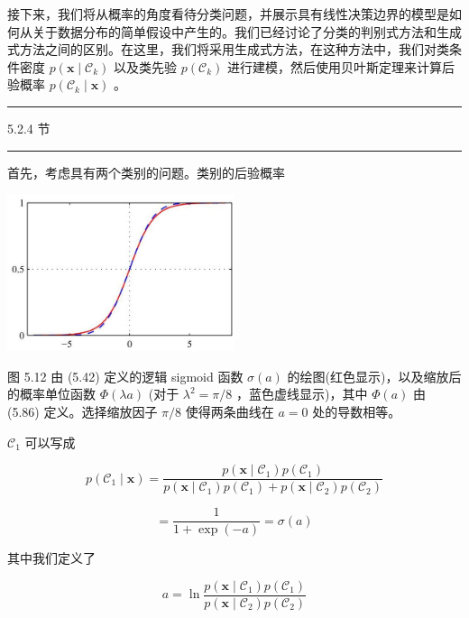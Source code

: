 \documentclass[10pt]{report}
\newcommand{\HRule}{\begin{center}\rule{0.9\linewidth}{0.2mm}\end{center}}
\begin{document}
接下来，我们将从概率的角度看待分类问题，并展示具有线性决策边界的模型是如何从关于数据分布的简单假设中产生的。我们已经讨论了分类的判别式方法和生成式方法之间的区别。在这里，我们将采用生成式方法，在这种方法中，我们对类条件密度 \(p\left( {\mathbf{x} \mid  {\mathcal{C}}_{k}}\right)\) 以及类先验 \(p\left( {\mathcal{C}}_{k}\right)\) 进行建模，然后使用贝叶斯定理来计算后验概率 \(p\left( {{\mathcal{C}}_{k} \mid  \mathbf{x}}\right)\) 。

\HRule

5.2.4 节

\HRule

首先，考虑具有两个类别的问题。类别的后验概率

\begin{center}
\includegraphics[max width=0.5\textwidth]{images/0194e279-9b28-703a-88f4-c3ac21e2010d_170_909_359_630_435_0.jpg}
\end{center}
\hspace*{3em} 

图 5.12 由 (5.42) 定义的逻辑 sigmoid 函数 \(\sigma \left( a\right)\) 的绘图(红色显示)，以及缩放后的概率单位函数 \(\Phi \left( {\lambda a}\right)\) (对于 \({\lambda }^{2} = \pi /8\) ，蓝色虚线显示)，其中 \(\Phi \left( a\right)\) 由 (5.86) 定义。选择缩放因子 \(\pi /8\) 使得两条曲线在 \(a = 0\) 处的导数相等。

\({\mathcal{C}}_{1}\) 可以写成

\[
p\left( {{\mathcal{C}}_{1} \mid  \mathbf{x}}\right)  = \frac{p\left( {\mathbf{x} \mid  {\mathcal{C}}_{1}}\right) p\left( {\mathcal{C}}_{1}\right) }{p\left( {\mathbf{x} \mid  {\mathcal{C}}_{1}}\right) p\left( {\mathcal{C}}_{1}\right)  + p\left( {\mathbf{x} \mid  {\mathcal{C}}_{2}}\right) p\left( {\mathcal{C}}_{2}\right) }
\]

\[
= \frac{1}{1 + \exp \left( {-a}\right) } = \sigma \left( a\right)  \tag{5.40}
\]

其中我们定义了

\[
a = \ln \frac{p\left( {\mathbf{x} \mid  {\mathcal{C}}_{1}}\right) p\left( {\mathcal{C}}_{1}\right) }{p\left( {\mathbf{x} \mid  {\mathcal{C}}_{2}}\right) p\left( {\mathcal{C}}_{2}\right) } \tag{5.41}
\]
\end{document}

